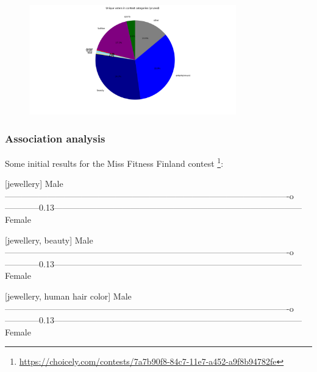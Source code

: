     \begin{figure}[h] 
        \begin{center}
            \includegraphics[width=0.8\textwidth]{Images/user_engagement_in_categories_pie-pruned.png}
            \caption{}
            \label{}
        \end{center}
    \end{figure}


    \subsubsection{Association analysis}
    Some initial results for the Miss Fitness Finland contest \footnote{\url{https://choicely.com/contests/7a7b90f8-84c7-11e7-a452-a9f8b94782fe}}: 

    [jewellery]
    Male ----------------------------------------------------------------------------------------------------o------------0.13--------------------------------------------------------------------------------------- Female
    
    [jewellery, beauty]
    Male ----------------------------------------------------------------------------------------------------o------------0.13--------------------------------------------------------------------------------------- Female

    [jewellery, human hair color]
    Male ----------------------------------------------------------------------------------------------------o------------0.13--------------------------------------------------------------------------------------- Female
    
